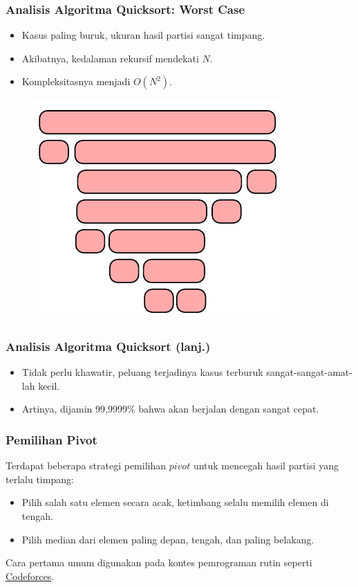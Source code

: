 \begin{frame}
\frametitle{Analisis Algoritma Quicksort: Worst Case}
\begin{itemize}
  \item Kasus paling buruk, ukuran hasil partisi sangat timpang.
  \item Akibatnya, kedalaman rekursif mendekati $N$.
  \item Kompleksitasnya menjadi $O(N^2)$.
\end{itemize}
\begin{figure}
  \centering
  \includegraphics[width=5 cm]{asset/quicksort-complexity-worst.pdf}
\end{figure}
\end{frame}

\begin{frame}
\frametitle{Analisis Algoritma Quicksort (lanj.)}
\begin{itemize}
  \item Tidak perlu khawatir, peluang terjadinya kasus terburuk sangat-sangat-amat-lah  kecil.
  \item Artinya, dijamin 99,9999\% bahwa \fQuickSort akan berjalan dengan sangat cepat.
\end{itemize}
\end{frame}

\begin{frame}
\frametitle{Pemilihan Pivot}
Terdapat beberapa strategi pemilihan $pivot$ untuk mencegah hasil partisi yang terlalu timpang:
\begin{itemize}
  \item Pilih salah satu elemen secara acak, ketimbang selalu memilih elemen di tengah.
  \item Pilih median dari elemen paling depan, tengah, dan paling belakang.
  \newline
\end{itemize}
Cara pertama umum digunakan pada kontes pemrograman rutin seperti \textcolor{blue}{\href{http://codeforces.com/}{Codeforces}}.
\end{frame}

